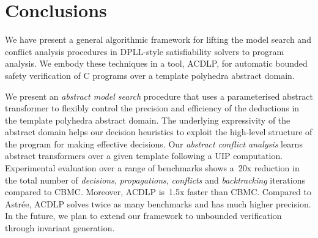 \section{Conclusions}

We have present a general algorithmic framework for lifting the
model search and conflict analysis procedures in DPLL-style satisfiability
solvers to program analysis.  We embody these techniques in a tool, ACDLP,
for automatic bounded safety verification of C programs over a template
polyhedra abstract domain.

We present an \emph{abstract model search} procedure that uses a
parameterised abstract transformer to flexibly control the precision and
efficiency of the deductions in the template polyhedra abstract domain.  The
underlying expressivity of the abstract domain helps our decision heuristics
to exploit the high-level structure of the program for making effective
decisions.  Our \emph{abstract conflict analysis} learns abstract
transformers over a given template following a UIP computation. 
Experimental evaluation over a range of benchmarks shows a~20x reduction in
the total number of \emph{decisions}, \emph{propagations}, \emph{conflicts}
and \emph{backtracking} iterations compared to CBMC.  Moreover, ACDLP
is~1.5x faster than CBMC.  Compared to Astr{\'e}e, ACDLP solves twice as
many benchmarks and has much higher precision.  In the future, we plan to
extend our framework to unbounded verification through invariant generation.

